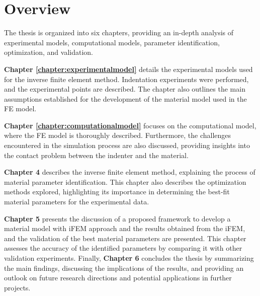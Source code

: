 \section{Overview}
The thesis is organized into six chapters, providing an in-depth analysis of experimental models, computational models, 
parameter identification, optimization, and validation. 

\textbf{Chapter \ref{chapter:experimentalmodel}} details the experimental models used for the inverse finite element method. 
Indentation experiments were performed, and the experimental points are described. The chapter also outlines 
the main assumptions established for the development of the material model used in the FE model.

\textbf{Chapter \ref{chapter:computationalmodel}} focuses on the computational model, where the FE model is thoroughly described. 
Furthermore, the challenges encountered in the simulation process are also discussed, providing insights into 
the contact problem between the indenter and the material.

\textbf{Chapter 4} describes the inverse finite element method, explaining the process of material parameter identification. 
This chapter also describes the optimization methods explored, highlighting its importance in determining the best-fit 
material parameters for the experimental data.

\textbf{Chapter 5} presents the discussion of a proposed framework to develop a material model with iFEM approach 
and the results obtained from the iFEM, and the validation of the best material parameters are presented. 
This chapter assesses the accuracy of the identified parameters by comparing it with other validation experiments.
Finally, \textbf{Chapter 6} concludes the thesis by summarizing the main findings, discussing the implications of the results, 
and providing an outlook on future research directions and potential applications in further projects.
